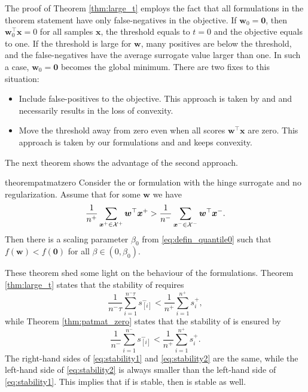 The proof of Theorem \ref{thm:large_t} employs the fact that all formulations in the theorem statement have only false-negatives in the objective. If $\bm{w}_0=\bm{0}$, then $\bm{w}_0^\top \bm{x}=0$ for all samples $\bm{x}$, the threshold equals to $t=0$ and the objective equals to one. If the threshold is large for $\bm{w}$, many positives are below the threshold, and the false-negatives have the average surrogate value larger than one. In such a case, $\bm{w}_0=\bm{0}$ becomes the global minimum. There are two fixes to this situation:
\begin{itemize}
  \item Include false-positives to the objective. This approach is taken by \Grill and \GrillNP and necessarily results in the loss of convexity.  \item Move the threshold away from zero even when all scores $\bm{w}^\top \bm{x}$ are zero. This approach is taken by our formulations \PatMat and \PatMatNP and keeps convexity.
\end{itemize}
The next theorem shows the advantage of the second approach.

\begin{restatable}{theorem}{patmatzero}\label{thm:patmat_zero}
  Consider the \PatMat or \PatMatNP formulation with the hinge surrogate and no regularization. Assume that for some $\bm{w}$ we have
  \begin{equation}\label{eq:patmat_zero}
    \frac{1}{n^+}\sum_{\bm{x}^+ \in \mathcal{X}^+}\bm{w}^\top \bm{x}^+ > \frac{1}{n^-}\sum_{\bm{x}^- \in \mathcal{X}^-}\bm{w}^\top \bm{x}^-.
  \end{equation}
  Then there is a scaling parameter $\beta_0$ from \eqref{eq:defin_quantile0} such that $f(\bm{w})<f(\bm{0})$ for all $\beta\in(0,\beta_0)$.
\end{restatable}

These theorem shed some light on the behaviour of the formulations. Theorem \ref{thm:large_t} states that the stability of \tauFPL requires
\begin{equation}\label{eq:stability1}
  \frac{1}{n^-\tau}\sum_{i=1}^{n^-\tau}s_{[i]}^- < \frac{1}{n^+}\sum_{i=1}^{n^+} s_{i}^+,
\end{equation}
while Theorem \ref{thm:patmat_zero} states that the stability of \PatMatNP is ensured by
\begin{equation}\label{eq:stability2}
  \frac{1}{n^-}\sum_{i=1}^{n^-}s_{[i]}^- < \frac{1}{n^+}\sum_{i=1}^{n^+} s_{i}^+.
\end{equation}
The right-hand sides of \eqref{eq:stability1} and \eqref{eq:stability2} are the same, while the left-hand side of \eqref{eq:stability2} is always smaller than the left-hand side of \eqref{eq:stability1}. This implies that if \tauFPL is stable, then \PatMatNP is stable as well.

